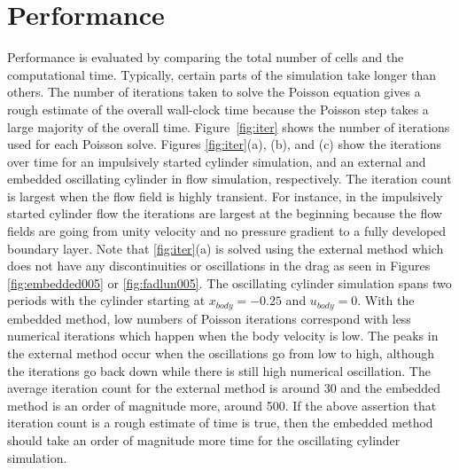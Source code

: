 \section{Performance}
Performance is evaluated by comparing the total number of cells and the computational time. 
Typically, certain parts of the simulation take longer than others. 
The number of iterations taken to solve the Poisson equation gives a rough estimate of the overall wall-clock time because the Poisson step takes a large majority of the overall time.
Figure~\ref{fig:iter} shows the number of iterations used for each Poisson solve. 
Figures \ref{fig:iter}(a), (b), and (c) show the iterations over time for an impulsively started cylinder simulation, and an external and embedded oscillating cylinder in flow simulation, respectively. 
The iteration count is largest when the flow field is highly transient. 
For instance, in the impulsively started cylinder flow the iterations are  largest at the beginning because the flow fields are going from unity velocity and no pressure gradient to a fully developed boundary layer. 
Note that \ref{fig:iter}(a) is solved using the external method which does not have any discontinuities or oscillations in the drag as seen in Figures \ref{fig:embedded005} or \ref{fig:fadlun005}. 
The oscillating cylinder simulation spans two periods with the cylinder starting at $x_{body} =-0.25$ and $u_{body} = 0$.
With the embedded method, low numbers of Poisson iterations correspond with less numerical iterations which happen when the body velocity is low.
The peaks in the external method occur when the oscillations go from low to high, although the iterations go back down while there is still high numerical oscillation. 
The average iteration count for the external method is around 30 and the embedded method is an order of magnitude more, around 500. 
If the above assertion that iteration count is a rough estimate of time is true, then the embedded method should take an order of magnitude more time for the oscillating cylinder simulation.

